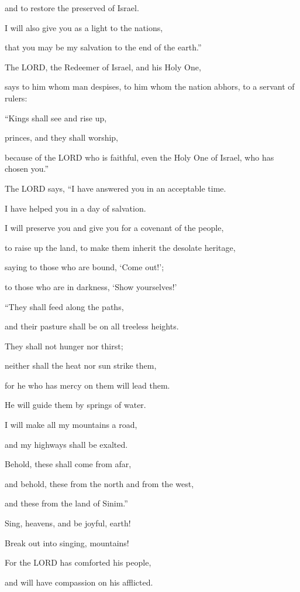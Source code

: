 and to restore the preserved of Israel.

I will also give you as a light to the nations,

that you may be my salvation to the end of the earth.”

\myverse{}The LORD, the Redeemer of Israel, and his Holy One,

says to him whom man despises, to him whom the nation abhors, to a servant of
rulers:

“Kings shall see and rise up,

princes, and they shall worship,

because of the LORD who is faithful, even the Holy One of Israel, who has chosen
you.”


\vspace{\baselineskip} \myverse{}The LORD says, “I have answered you in an acceptable time.

I have helped you in a day of salvation.

I will preserve you and give you for a covenant of the people,

to raise up the land, to make them inherit the desolate heritage,

\myverse{}saying to those who are bound, ‘Come out!’;

to those who are in darkness, ‘Show yourselves!’

“They shall feed along the paths,

and their pasture shall be on all treeless heights.

\myverse{}They shall not hunger nor thirst;

neither shall the heat nor sun strike them,

for he who has mercy on them will lead them.

He will guide them by springs of water.

\myverse{}I will make all my mountains a road,

and my highways shall be exalted.

\myverse{}Behold, these shall come from afar,

and behold, these from the north and from the west,

and these from the land of Sinim.”

\myverse{}Sing, heavens, and be joyful, earth!

Break out into singing, mountains!

For the LORD has comforted his people,

and will have compassion on his afflicted.


